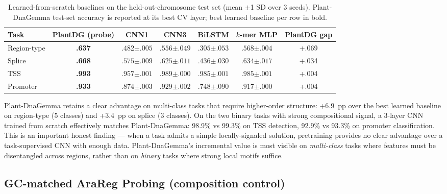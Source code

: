 \documentclass{article}
\begin{document}
\begin{table}[t]
\centering
\small
\caption{Learned-from-scratch baselines on the held-out-chromosome test set
(mean $\pm$1 SD over 3 seeds). Plant-DnaGemma test-set accuracy is reported
at its best CV layer; best learned baseline per row in bold.}
\label{tab:baselines}
\begin{tabular}{lcccccc}
\toprule
Task & PlantDG (probe) & CNN1 & CNN3 & BiLSTM & $k$-mer MLP & PlantDG gap \\
\midrule
Region-type & \textbf{.637} & $.482{\scriptstyle\pm.005}$ & $.556{\scriptstyle\pm.049}$ & $.305{\scriptstyle\pm.053}$ & $\mathbf{.568}{\scriptstyle\pm.004}$ & +.069 \\
Splice      & \textbf{.668} & $.575{\scriptstyle\pm.009}$ & $.625{\scriptstyle\pm.011}$ & $.436{\scriptstyle\pm.030}$ & $\mathbf{.634}{\scriptstyle\pm.017}$ & +.034 \\
TSS         & \textbf{.993} & $.957{\scriptstyle\pm.001}$ & $\mathbf{.989}{\scriptstyle\pm.000}$ & $.985{\scriptstyle\pm.001}$ & $.985{\scriptstyle\pm.001}$ & +.004 \\
Promoter    & \textbf{.933} & $.874{\scriptstyle\pm.003}$ & $\mathbf{.929}{\scriptstyle\pm.002}$ & $.748{\scriptstyle\pm.090}$ & $.917{\scriptstyle\pm.000}$ & +.004 \\
\bottomrule
\end{tabular}
\end{table}

Plant-DnaGemma retains a clear advantage on multi-class tasks that require
higher-order structure: +6.9~pp over the best learned baseline on region-type
(5 classes) and +3.4~pp on splice (3 classes). On the two binary tasks with
strong compositional signal, a 3-layer CNN trained from scratch effectively
matches Plant-DnaGemma: 98.9\% vs 99.3\% on TSS detection, 92.9\% vs 93.3\% on
promoter classification. This is an important honest finding --- when a
task admits a simple locally-signaled solution, pretraining provides no clear
advantage over a task-supervised CNN with enough data. Plant-DnaGemma's
incremental value is most visible on \emph{multi-class} tasks where features
must be disentangled across regions, rather than on \emph{binary} tasks
where strong local motifs suffice.

\subsection{GC-matched AraReg Probing (composition control)}
\label{sec:gcmatched-arareg}
\end{document}
